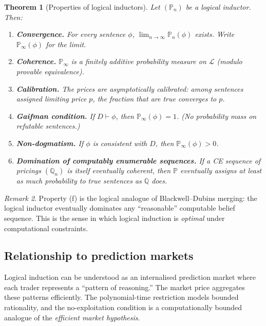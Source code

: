 \documentclass[11pt,a4paper]{article}
\newtheorem{theorem}{Theorem}[section]
\theoremstyle{definition}
\theoremstyle{remark}
\newtheorem{remark}[theorem]{Remark}
\begin{document}
\begin{theorem}[Properties of logical inductors]\label{thm:li-props}
Let $(\mathbb{P}_n)$ be a logical inductor.  Then:
\begin{enumerate}[label=(\alph*)]
  \item \textbf{Convergence.} For every sentence $\phi$,
    $\lim_{n \to \infty} \mathbb{P}_n(\phi)$ exists.  Write
    $\mathbb{P}_\infty(\phi)$ for the limit.
  \item \textbf{Coherence.} $\mathbb{P}_\infty$ is a finitely additive
    probability measure on $\mathcal{L}$ (modulo provable equivalence).
  \item \textbf{Calibration.} The prices are asymptotically calibrated:
    among sentences assigned limiting price $p$, the fraction that are
    true converges to $p$.
  \item \textbf{Gaifman condition.} If $D \vdash \phi$, then
    $\mathbb{P}_\infty(\phi) = 1$.  (No probability mass on refutable
    sentences.)
  \item \textbf{Non-dogmatism.} If $\phi$ is consistent with $D$, then
    $\mathbb{P}_\infty(\phi) > 0$.
  \item \textbf{Domination of computably enumerable sequences.}
    If a CE sequence of pricings $(\mathbb{Q}_n)$ is itself eventually
    coherent, then $\mathbb{P}$ eventually assigns at least as much
    probability to true sentences as $\mathbb{Q}$ does.
\end{enumerate}
\end{theorem}

\begin{remark}
Property (f) is the logical analogue of Blackwell--Dubins merging: the
logical inductor eventually dominates any ``reasonable'' computable
belief sequence.  This is the sense in which logical induction is
\emph{optimal} under computational constraints.
\end{remark}

\subsection{Relationship to prediction markets}

Logical induction can be understood as an internalised prediction market
where each trader represents a ``pattern of reasoning.'' The market
price aggregates these patterns efficiently.  The polynomial-time
restriction models bounded rationality, and the no-exploitation
condition is a computationally bounded analogue of the \emph{efficient
market hypothesis}.
\end{document}
